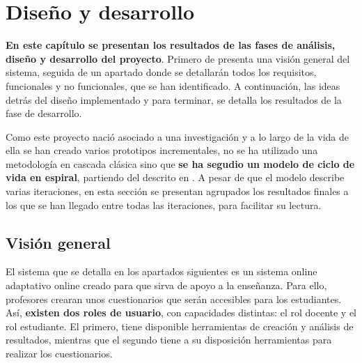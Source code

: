 \chapter{Diseño y desarrollo\label{sec:disenhoYDesarrollo}}


%

\textbf{En este capítulo se presentan los resultados de las fases de análisis, diseño y desarrollo del proyecto}. Primero de presenta una visión general del sistema, seguida de un apartado donde se detallarán todos los requisitos, funcionales y no funcionales, que se han identificado. A continuación, las ideas detrás del diseño implementado y para terminar, se detalla los resultados de la fase de desarrollo.

Como este proyecto nació asociado a una investigación y a lo largo de la vida de ella se han creado varios prototipos incrementales, no se ha utilizado una metodología en cascada clásica sino que \textbf{se ha segudio un modelo de ciclo de vida en espiral}, partiendo del descrito en \cite{Boehm86}. A pesar de que el modelo describe varias iteraciones, en esta sección se presentan agrupados los resultados finales a los que se han llegado entre todas las iteraciones, para facilitar su lectura.


\section{Visión general}

El sistema que se detalla en los apartados siguientes es un sistema online adaptativo online creado para que sirva de apoyo a la enseñanza. Para ello, profesores crearan unos cuestionarios que serán accesibles para los estudiantes. Así, \textbf{existen dos roles de usuario}, con capacidades distintas: el rol docente y el rol estudiante. El primero, tiene disponible herramientas de creación y análisis de resultados, mientras que el segundo tiene a su disposición herramientas para realizar los cuestionarios.

